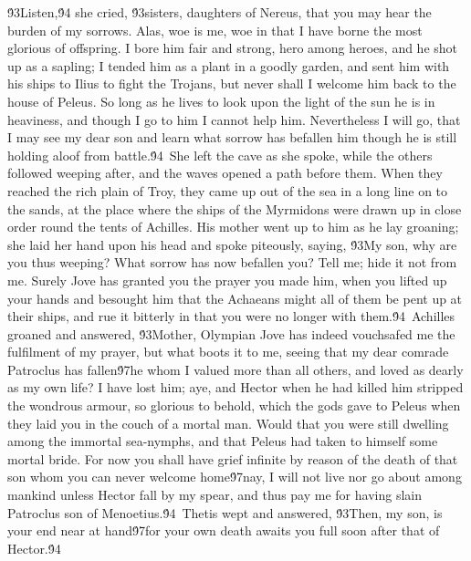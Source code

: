 {\'93Listen,\'94 she cried, \'93sisters, daughters of Nereus, that you may hear the burden of my sorrows. Alas, woe is me, woe in that I have borne the most glorious of offspring. I bore him fair and strong, hero among heroes, and he shot up as a sapling; I tended him as a plant in a goodly garden, and sent him with his ships to Ilius to fight the Trojans, but never shall I welcome him back to the house of Peleus. So long as he lives to look upon the light of the sun he is in heaviness, and though I go to him I cannot help him. Nevertheless I will go, that I may see my dear son and learn what sorrow has befallen him though he is still holding aloof from battle.\'94\
She left the cave as she spoke, while the others followed weeping after, and the waves opened a path before them. When they reached the rich plain of Troy, they came up out of the sea in a long line on to the sands, at the place where the ships of the Myrmidons were drawn up in close order round the tents of Achilles. His mother went up to him as he lay groaning; she laid her hand upon his head and spoke piteously, saying, \'93My son, why are you thus weeping? What sorrow has now befallen you? Tell me; hide it not from me. Surely Jove has granted you the prayer you made him, when you lifted up your hands and besought him that the Achaeans might all of them be pent up at their ships, and rue it bitterly in that you were no longer with them.\'94\
Achilles groaned and answered, \'93Mother, Olympian Jove has indeed vouchsafed me the fulfilment of my prayer, but what boots it to me, seeing that my dear comrade Patroclus has fallen\'97he whom I valued more than all others, and loved as dearly as my own life? I have lost him; aye, and Hector when he had killed him stripped the wondrous armour, so glorious to behold, which the gods gave to Peleus when they laid you in the couch of a mortal man. Would that you were still dwelling among the immortal sea-nymphs, and that Peleus had taken to himself some mortal bride. For now you shall have grief infinite by reason of the death of that son whom you can never welcome home\'97nay, I will not live nor go about among mankind unless Hector fall by my spear, and thus pay me for having slain Patroclus son of Menoetius.\'94\
Thetis wept and answered, \'93Then, my son, is your end near at hand\'97for your own death awaits you full soon after that of Hector.\'94\
}
